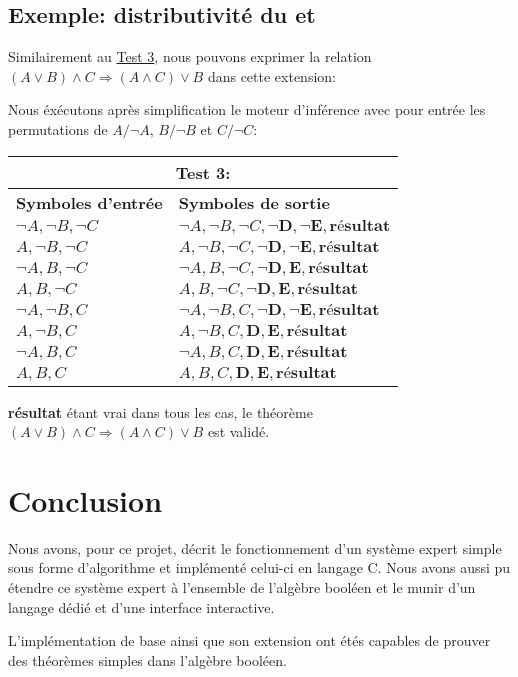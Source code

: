 \documentclass[12pt]{article}
\begin{document}
\subsection{Exemple: distributivité du \og et \fg}

Similairement au \hyperref[T3]{Test 3}, nous pouvons exprimer la relation $(A \lor B) \land C \Rightarrow (A \land C) \lor B$ dans cette extension:

\begin{algorithm}[H]
\end{algorithm}

Nous éxécutons après simplification le moteur d'inférence avec pour entrée les permutations de $A/\neg A$, $B/\neg B$ et $C/\neg C$:

\begin{tabular}{|p{4cm}|p{6.5cm}|}
  \hline
  \multicolumn{2}{|c|}{\textbf{Test 3:}} \\
  \hline
  \textbf{Symboles d'entrée} & \textbf{Symboles de sortie} \\
  \hline
  $\neg A, \neg B, \neg C$ & $\neg A, \neg B, \neg C, \mathbf{\neg D}, \mathbf{\neg E}, \textbf{résultat}$ \\
  \hline
  $A, \neg B, \neg C$ & $A, \neg B, \neg C, \mathbf{\neg D}, \mathbf{\neg E}, \textbf{résultat}$ \\
  \hline
  $\neg A, B, \neg C$ & $\neg A, B, \neg C, \mathbf{\neg D}, \mathbf{E}, \textbf{résultat}$ \\
  \hline
  $A, B, \neg C$ & $A, B, \neg C, \mathbf{\neg D}, \mathbf{E}, \textbf{résultat}$ \\
  \hline
  $\neg A, \neg B, C$ & $\neg A, \neg B, C, \mathbf{\neg D}, \mathbf{\neg E}, \textbf{résultat}$ \\
  \hline
  $A, \neg B, C$ & $A, \neg B, C, \mathbf{D}, \mathbf{E}, \textbf{résultat}$ \\
  \hline
  $\neg A, B, C$ & $\neg A, B, C, \mathbf{D}, \mathbf{E}, \textbf{résultat}$ \\
  \hline
  $A, B, C$ & $A, B, C, \mathbf{D}, \mathbf{E}, \textbf{résultat}$ \\
  \hline
\end{tabular}

\textbf{résultat} étant vrai dans tous les cas, le théorème $(A \lor B) \land C \Rightarrow (A \land C) \lor B$ est validé.

\section{Conclusion}

Nous avons, pour ce projet, décrit le fonctionnement d'un système expert simple sous forme d'algorithme et implémenté celui-ci en langage C.
Nous avons aussi pu étendre ce système expert à l'ensemble de l'algèbre booléen et le munir d'un langage dédié et d'une interface interactive.

L'implémentation de base ainsi que son extension ont étés capables de prouver des théorèmes simples dans l'algèbre booléen.
\end{document}
